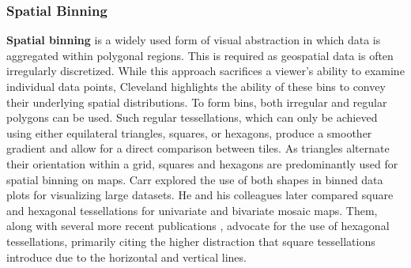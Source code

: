 \subsubsection{Spatial Binning}
\textbf{Spatial binning} is a widely used form of visual abstraction in which data is aggregated within polygonal regions. 
%
This is required as geospatial data is often irregularly discretized.
%
While this approach sacrifices a viewer’s ability to examine individual data points, Cleveland \cite{cleveland1985graphical} highlights the ability of these bins to convey their underlying spatial distributions. 
%
To form bins, both irregular and regular polygons can be used. 
%
%
Such regular tessellations, which can only be achieved using either equilateral triangles, squares, or hexagons, produce a smoother gradient and allow for a direct comparison between tiles. 
%
As triangles alternate their orientation within a grid, squares and hexagons are predominantly used for spatial binning on maps.
%
Carr \cite{carr1990looking} explored the use of both shapes in binned data plots for visualizing large datasets.
%
He and his colleagues \cite{carr_hexagon_1992} later compared square and hexagonal tessellations for univariate and bivariate mosaic maps. 
%
Them, along with several more recent publications \cite{birch2007rectangular, shelton2014mapping}, advocate for the use of hexagonal tessellations, primarily citing the higher distraction that square tessellations introduce due to the horizontal and vertical lines.
%
